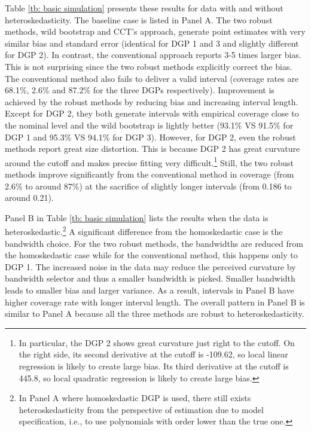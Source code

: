 \documentclass[12pt,]{article}
\DeclareMathOperator{\1}{\mathbbm{1}}
\begin{document}
Table \ref{tb: basic simulation} presents these results for data with and without heteroskedasticity. The baseline case is listed in Panel A. The two robust methods, wild bootstrap and CCT's approach, generate point estimates with very similar bias and standard error (identical for DGP 1 and 3 and slightly different for DGP 2). In contrast, the conventional approach reports 3-5 times larger bias. This is not surprising since the two robust methods explicitly correct the bias. The conventional method also fails to deliver a valid interval (coverage rates are 68.1\%, 2.6\% and 87.2\% for the three DGPs respectively). Improvement is achieved by the robust methods by reducing bias and increasing interval length. Except for DGP 2, they both generate intervals with empirical coverage close to the nominal level and the wild bootstrap is lightly better (93.1\% VS 91.5\% for DGP 1 and 95.3\% VS 94.1\% for DGP 3). However, for DGP 2, even the robust methods report great size distortion. This is because DGP 2 has great curvature around the cutoff and makes precise fitting very difficult.\footnote{In particular, the DGP 2 shows great curvature just right to the cutoff. On the right side, its second derivative at the cutoff is -109.62, so local linear regression is likely to create large bias. Its third derivative at the cutoff is 445.8, so local quadratic regression is likely to create large bias.} Still, the two robust methods improve significantly from the conventional method in coverage (from 2.6\% to around 87\%) at the sacrifice of slightly longer intervals (from 0.186 to around 0.21).

Panel B in Table \ref{tb: basic simulation} lists the results when the data is heteroskedastic.\footnote{In Panel A where homoskedastic DGP is used, there still exists heteroskedasticity from the perspective of estimation due to model specification, i.e., to use polynomials with order lower than the true one.} A significant difference from the homoskedastic case is the bandwidth choice. For the two robust methods, the bandwidths are reduced from the homoskedastic case while for the conventional method, this happens only to DGP 1. The increased noise in the data may reduce the perceived curvature by bandwidth selector and thus a smaller bandwidth is picked. Smaller bandwidth leads to smaller bias and larger variance. As a result, intervals in Panel B have higher coverage rate with longer interval length. The overall pattern in Panel B is similar to Panel A because all the three methods are robust to heteroskedasticity.
\end{document}
